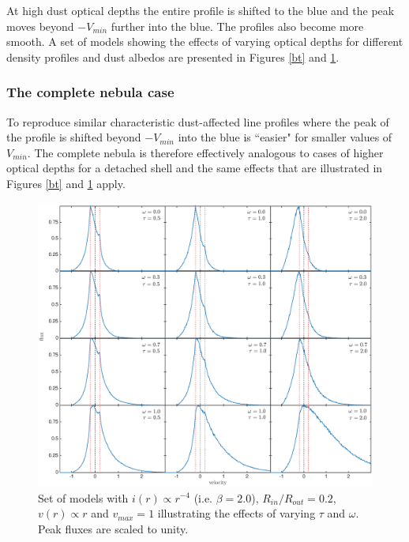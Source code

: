 At high dust optical depths the entire profile is shifted to the blue and the 
peak moves beyond $-V_{min}$ further into the blue.  The 
profiles also become more smooth.  A set of models showing 
the effects of varying optical depths for different density profiles and 
dust albedos are presented in Figures \ref{bt} and \ref{wt}.



\subsubsection{The complete nebula case}

To reproduce similar characteristic dust-affected line profiles where the peak of the profile is shifted beyond $-V_{min}$ into the blue is ``easier" for smaller values of $V_{min}$.  The complete nebula is therefore effectively analogous to cases of higher optical depths for a detached shell and the same effects that are illustrated in Figures \ref{bt} and \ref{wt} apply.


\begin{figure}
\includegraphics[trim =80 60 40 15,clip=true,scale=0.45]{chapters/chapter4/images/params/C/C_all}
\caption{Set of models with $i(r) \propto r^{-4}$ (i.e. $\beta=2.0$), $R_{in}/R_{out}=0.2$, $v(r) \propto r$  
and $v_{max}=1$ illustrating the effects of varying $\tau$ and $\omega$. 
Peak fluxes are scaled to unity.}
\label{wt}
\end{figure}


